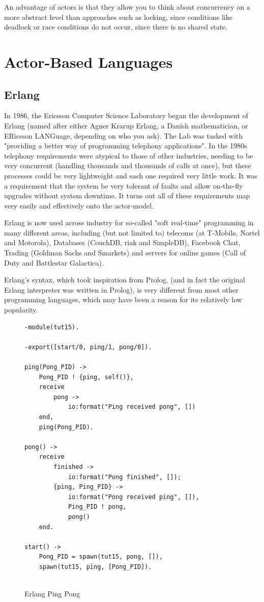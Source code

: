 \documentclass[11pt,a4paper]{report}
\begin{document}
An advantage of actors is that they allow you to think about concurrency on a more abstract level than approaches such as locking, since conditions like deadlock or race conditions do not occur, since there is no shared state.

\newpage
\section{Actor-Based Languages}

\subsection{Erlang}

In 1986, the Ericsson Computer Science Laboratory began the development of Erlang\cite{armstrong2007} (named after either Agner Krarup Erlang, a Danish mathematician, or ERicsson LANGuage, depending on who you ask).
The Lab was tasked with "providing a better way of programming telephony applications".
In the 1980s telephony requirements were atypical to those of other industries, needing to be very concurrent (handling thousands and thousands of calls at once), but these processes could be very lightweight and each one required very little work.
It was a requirement that the system be very tolerant of faults and allow on-the-fly upgrades without system downtime.
It turns out all of these requirements map very easily and effectively onto the actor-model.

Erlang is now used across industry for so-called "soft real-time" programming in many different areas, including (but not limited to) telecoms (at T-Mobile, Nortel and Motorola), Databases (CouchDB, riak and SimpleDB), Facebook Chat, Trading (Goldman Sachs and Smarkets) and servers for online games (Call of Duty and Battlestar Galactica)\cite{erlang-uses}.

Erlang's syntax, which took inspiration from Prolog, (and in fact the original Erlang interpreter was written in Prolog), is very different from most other programming languages, which may have been a reason for its relatively low popularity.

\begin{figure}[H]
\begin{verbatim}
-module(tut15).

-export([start/0, ping/1, pong/0]).

ping(Pong_PID) ->
    Pong_PID ! {ping, self()},
    receive
        pong ->
            io:format("Ping received pong", [])
    end,
    ping(Pong_PID).

pong() ->
    receive
        finished ->
            io:format("Pong finished", []);
        {ping, Ping_PID} ->
            io:format("Pong received ping", []),
            Ping_PID ! pong,
            pong()
    end.

start() ->
    Pong_PID = spawn(tut15, pong, []),
    spawn(tut15, ping, [Pong_PID]).
    
\end{verbatim}
\caption{Erlang Ping Pong\cite{erlang-ping}}
\label{fig:erlang-ping}
\end{figure}
\end{document}
